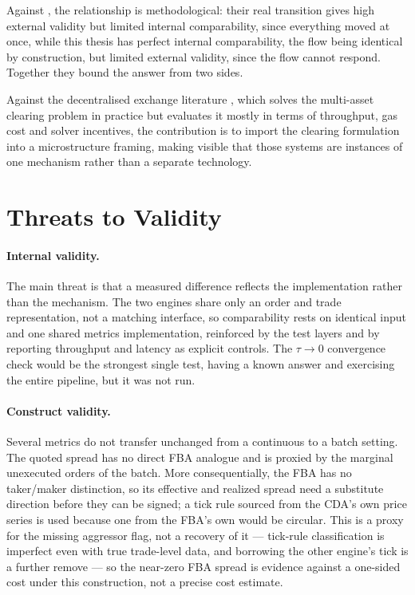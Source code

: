 Against \citet{lee2026taiwan}, the relationship is methodological: their
real transition gives high external validity but limited internal
comparability, since everything moved at once, while this thesis has perfect
internal comparability, the flow being identical by construction, but
limited external validity, since the flow cannot respond. Together they bound
the answer from two sides.

Against the decentralised exchange literature
\citep{walther2021multitoken,ramsay2023speedex,dutta2025cow}, which solves
the multi-asset clearing problem in practice but evaluates it mostly in
terms of throughput, gas cost and solver incentives, the contribution is to
import the clearing formulation into a microstructure framing, making
visible that those systems are instances of one mechanism rather than a
separate technology.

\section{Threats to Validity}
\label{sec:validity}

\paragraph{Internal validity.} The main threat is that a measured
difference reflects the implementation rather than the mechanism. The two
engines share only an order and trade representation, not a matching
interface, so comparability rests on identical input and one shared metrics
implementation, reinforced by the test layers and by reporting throughput
and latency as explicit controls. The $\tau \to 0$ convergence check would
be the strongest single test, having a known answer and exercising the
entire pipeline, but it was not run.

\paragraph{Construct validity.} Several metrics do not transfer unchanged
from a continuous to a batch setting. The quoted spread has no direct FBA
analogue and is proxied by the marginal unexecuted orders of the batch.
More consequentially, the FBA has no taker/maker distinction, so its
effective and realized spread need a substitute direction before they can
be signed; a tick rule sourced from the CDA's own price series is used
because one from the FBA's own would be circular. This is a proxy for the
missing aggressor flag, not a recovery of it --- tick-rule classification is
imperfect even with true trade-level data, and borrowing the other engine's
tick is a further remove --- so the near-zero FBA spread is evidence against
a one-sided cost under this construction, not a precise cost estimate.

